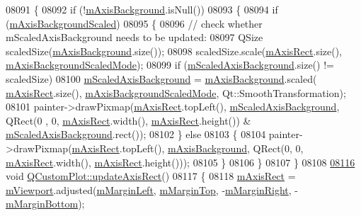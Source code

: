 \begin{DoxyCode}
08091 \{
08092   \textcolor{keywordflow}{if} (!\hyperlink{a00116_ab93f80321dad937ebc6f2eaad1640c50}{mAxisBackground}.isNull())
08093   \{
08094     \textcolor{keywordflow}{if} (\hyperlink{a00116_aa02865bc98b010e95c3aab39a3439ed0}{mAxisBackgroundScaled})
08095     \{
08096       \textcolor{comment}{// check whether mScaledAxisBackground needs to be updated:}
08097       QSize scaledSize(\hyperlink{a00116_ab93f80321dad937ebc6f2eaad1640c50}{mAxisBackground}.size());
08098       scaledSize.scale(\hyperlink{a00116_aad382d311cfe6a81f47aa4ae3350021b}{mAxisRect}.size(), \hyperlink{a00116_a513c32c470438510a3341295b0ead04a}{mAxisBackgroundScaledMode});
08099       \textcolor{keywordflow}{if} (\hyperlink{a00116_a9c0be35152f1cb89789149791f99044c}{mScaledAxisBackground}.size() != scaledSize)
08100         \hyperlink{a00116_a9c0be35152f1cb89789149791f99044c}{mScaledAxisBackground} = \hyperlink{a00116_ab93f80321dad937ebc6f2eaad1640c50}{mAxisBackground}.scaled(
      \hyperlink{a00116_aad382d311cfe6a81f47aa4ae3350021b}{mAxisRect}.size(), \hyperlink{a00116_a513c32c470438510a3341295b0ead04a}{mAxisBackgroundScaledMode}, Qt::SmoothTransformation);
08101       painter->drawPixmap(\hyperlink{a00116_aad382d311cfe6a81f47aa4ae3350021b}{mAxisRect}.topLeft(), \hyperlink{a00116_a9c0be35152f1cb89789149791f99044c}{mScaledAxisBackground}, QRect(0
      , 0, \hyperlink{a00116_aad382d311cfe6a81f47aa4ae3350021b}{mAxisRect}.width(), \hyperlink{a00116_aad382d311cfe6a81f47aa4ae3350021b}{mAxisRect}.height()) & 
      \hyperlink{a00116_a9c0be35152f1cb89789149791f99044c}{mScaledAxisBackground}.rect());
08102     \} \textcolor{keywordflow}{else}
08103     \{
08104       painter->drawPixmap(\hyperlink{a00116_aad382d311cfe6a81f47aa4ae3350021b}{mAxisRect}.topLeft(), \hyperlink{a00116_ab93f80321dad937ebc6f2eaad1640c50}{mAxisBackground}, QRect(0, 0, 
      \hyperlink{a00116_aad382d311cfe6a81f47aa4ae3350021b}{mAxisRect}.width(), \hyperlink{a00116_aad382d311cfe6a81f47aa4ae3350021b}{mAxisRect}.height()));
08105     \}
08106   \}
08107 \}
08108 
\hypertarget{a00115_source_l08116}{}\hyperlink{a00116_a428242419d3a1b63f2cbff637986c35c}{08116} \textcolor{keywordtype}{void} \hyperlink{a00116_a428242419d3a1b63f2cbff637986c35c}{QCustomPlot::updateAxisRect}()
08117 \{
08118   \hyperlink{a00116_aad382d311cfe6a81f47aa4ae3350021b}{mAxisRect} = \hyperlink{a00116_a69feeea9d5254eab8ba7f9be13f85e0b}{mViewport}.adjusted(\hyperlink{a00116_a011307bfbe2ac7e60f13d2fa45e31113}{mMarginLeft}, 
      \hyperlink{a00116_a746a9e31a0cf3ce3be1bbd3a6fa2c8be}{mMarginTop}, -\hyperlink{a00116_af5efe5736378d5f8061fd6bf5dc92a2d}{mMarginRight}, -\hyperlink{a00116_ad02e2d81ae66d4261d1e46a6979ea118}{mMarginBottom});

\end{DoxyCode}
